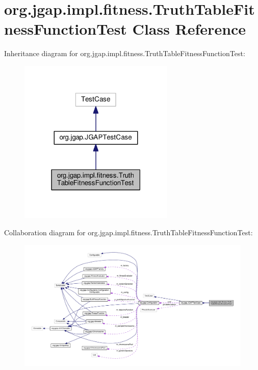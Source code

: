 \hypertarget{classorg_1_1jgap_1_1impl_1_1fitness_1_1_truth_table_fitness_function_test}{\section{org.\-jgap.\-impl.\-fitness.\-Truth\-Table\-Fitness\-Function\-Test Class Reference}
\label{classorg_1_1jgap_1_1impl_1_1fitness_1_1_truth_table_fitness_function_test}
}


Inheritance diagram for org.\-jgap.\-impl.\-fitness.\-Truth\-Table\-Fitness\-Function\-Test\-:
\nopagebreak
\begin{figure}[H]
\begin{center}
\leavevmode
\includegraphics[width=210pt]{classorg_1_1jgap_1_1impl_1_1fitness_1_1_truth_table_fitness_function_test__inherit__graph}
\end{center}
\end{figure}


Collaboration diagram for org.\-jgap.\-impl.\-fitness.\-Truth\-Table\-Fitness\-Function\-Test\-:
\nopagebreak
\begin{figure}[H]
\begin{center}
\leavevmode
\includegraphics[width=350pt]{classorg_1_1jgap_1_1impl_1_1fitness_1_1_truth_table_fitness_function_test__coll__graph}
\end{center}
\end{figure}
